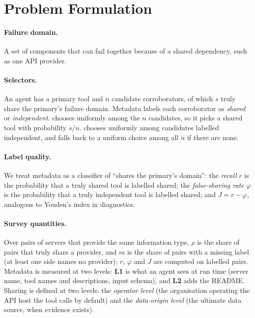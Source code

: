 \section{Problem Formulation}\label{sec:formulation}

\paragraph{Failure domain.} A set of components that can fail together because of a shared dependency, such as one API provider.

\paragraph{Selectors.} An agent has a primary tool and $n$ candidate corroborators, of which $s$ truly share the primary's failure domain. Metadata labels each corroborator as \emph{shared} or \emph{independent}.
 chooses uniformly among the $n$ candidates, so it picks a shared tool with probability $s/n$.
 chooses uniformly among candidates labelled independent, and falls back to a uniform choice among all $n$ if there are none.

\paragraph{Label quality.} We treat metadata as a classifier of ``shares the primary's domain'':
the \emph{recall} $r$ is the probability that a truly shared tool is labelled shared;
the \emph{false-sharing rate} $\varphi$ is the probability that a truly independent tool is labelled shared;
and $J = r - \varphi$, analogous to Youden's index in diagnostics.

\paragraph{Survey quantities.} Over pairs of servers that provide the same information type, $\rho$ is the share of pairs that truly share a provider, and $m$ is the share of pairs with a missing label (at least one side names no provider); $r$, $\varphi$ and $J$ are computed on labelled pairs. Metadata is measured at two levels: \textbf{L1} is what an agent sees at run time (server name, tool names and descriptions, input schema), and \textbf{L2} adds the README. Sharing is defined at two levels: the \emph{operator level} (the organisation operating the API host the tool calls by default) and the \emph{data-origin level} (the ultimate data source, when evidence exists).
